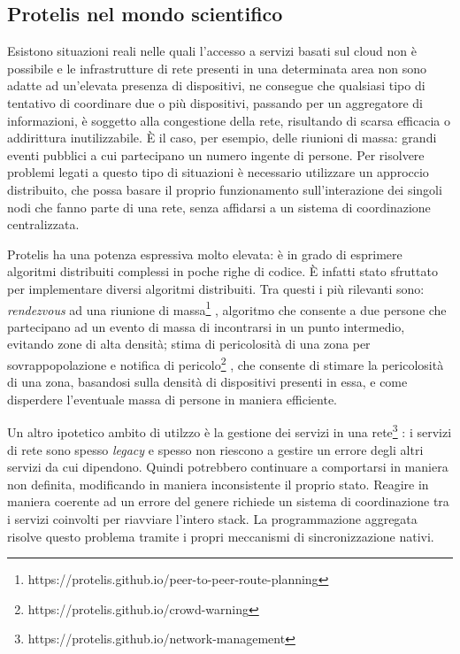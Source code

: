 \subsection{Protelis nel mondo scientifico}
Esistono situazioni reali nelle quali l'accesso a servizi basati sul cloud non è
possibile e le infrastrutture di rete presenti in una determinata area non sono
adatte ad un'elevata presenza di dispositivi, ne consegue che qualsiasi tipo di
tentativo di coordinare due o più dispositivi, passando per un aggregatore di
informazioni, è soggetto alla congestione della rete, risultando di scarsa
efficacia o addirittura inutilizzabile. È il caso, per esempio, delle riunioni
di massa: grandi eventi pubblici a cui partecipano un numero ingente di persone.
Per risolvere problemi legati a questo tipo di situazioni è necessario
utilizzare un approccio distribuito, che possa basare il proprio funzionamento
sull'interazione dei singoli nodi che fanno parte di una rete, senza affidarsi a
un sistema di coordinazione centralizzata.

Protelis ha una potenza espressiva molto elevata: è in grado di esprimere
algoritmi distribuiti complessi in poche righe di codice. È infatti stato
sfruttato per implementare diversi algoritmi distribuiti. Tra questi i più
rilevanti sono: \textit{rendezvous} ad una riunione di
massa\footnote{https://protelis.github.io/peer-to-peer-route-planning}
\cite{Protelis}, algoritmo che consente a due persone che partecipano ad un
evento di massa di incontrarsi in un punto intermedio, evitando zone di alta
densità; stima di pericolosità di una zona per sovrappopolazione e notifica di
pericolo\footnote{https://protelis.github.io/crowd-warning} \cite{7056345}, che
consente di stimare la pericolosità di una zona, basandosi sulla densità di
dispositivi presenti in essa, e come disperdere l'eventuale massa di persone in
maniera efficiente.

Un altro ipotetico ambito di utilzzo è la gestione dei servizi in una
rete\footnote{https://protelis.github.io/network-management} \cite{Protelis}: i
servizi di rete sono spesso \textit{legacy} e spesso non riescono a gestire un
errore degli altri servizi da cui dipendono. Quindi potrebbero continuare a
comportarsi in maniera non definita, modificando in maniera inconsistente il
proprio stato. Reagire in maniera coerente ad un errore del genere richiede un
sistema di coordinazione tra i servizi coinvolti per riavviare l'intero
stack. La programmazione aggregata risolve questo problema tramite i propri
meccanismi di sincronizzazione nativi.

